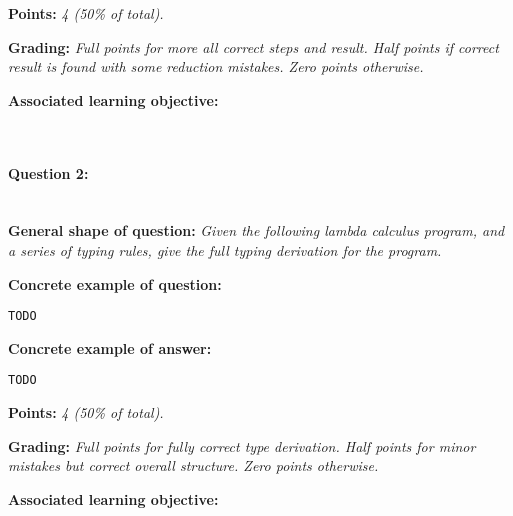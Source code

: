 \textbf{Points:} \textit{4 (50\% of total).}

\textbf{Grading:} \textit{Full points for more all correct steps and result. Half points if correct result is found with some reduction mistakes. Zero points otherwise.}

\textbf{Associated learning objective:} 

\ \\ 

\paragraph{Question 2: } \ \\

\textbf{General shape of question:} \textit{Given the following lambda calculus program, and a series of typing rules, give the full typing derivation for the program.}

\textbf{Concrete example of question:} 

\lstset{numbers=left,basicstyle=\ttfamily\small}\lstset{language=[Sharp]C}
\begin{lstlisting}
TODO
\end{lstlisting}

\textbf{Concrete example of answer:} \textit{}

\begin{lstlisting}
TODO
\end{lstlisting}

\textbf{Points:} \textit{4 (50\% of total).}

\textbf{Grading:} \textit{Full points for fully correct type derivation. Half points for minor mistakes but correct overall structure. Zero points otherwise.}

\textbf{Associated learning objective:} 

\ \\
